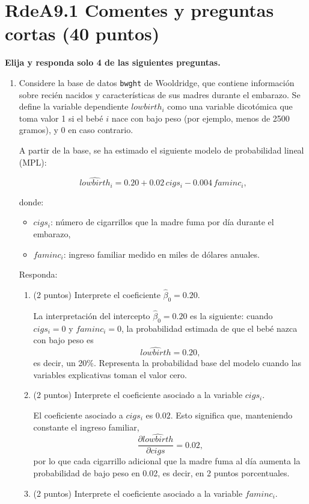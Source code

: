 \documentclass[10pt,a4paper]{article}
\begin{document}
\section{RdeA9.1 Comentes y preguntas cortas (40 puntos)}
{\bf Elija y responda solo 4 de las siguientes preguntas.}
\begin{enumerate}
    \item 
Considere la base de datos \texttt{bwght} de Wooldridge, que contiene información sobre recién nacidos
y características de sus madres durante el embarazo. Se define la variable dependiente
$lowbirth_i$ como una variable dicotómica que toma valor 1 si el bebé $i$ nace con bajo peso
(por ejemplo, menos de 2500 gramos), y 0 en caso contrario.

A partir de la base, se ha estimado el siguiente modelo de probabilidad lineal (MPL):

\[
\widehat{lowbirth}_i
= 0.20 + 0.02\, cigs_i - 0.004\, faminc_i,
\]

donde:
\begin{itemize}
    \item $cigs_i$: número de cigarrillos que la madre fuma por día durante el embarazo,
    \item $faminc_i$: ingreso familiar medido en miles de dólares anuales.
\end{itemize}

Responda:

\begin{enumerate}
    \item (2 puntos) Interprete el coeficiente $\hat\beta_0 = 0.20$.

\color{blue}
La interpretación del intercepto $\hat\beta_0 = 0.20$ es la siguiente:
    cuando $cigs_i = 0$ y $faminc_i = 0$, la probabilidad estimada de que el bebé
    nazca con bajo peso es
    \[
        \widehat{lowbirth} = 0.20,
    \]
    es decir, un 20\%. Representa la probabilidad base del modelo cuando las
    variables explicativas toman el valor cero.
\color{black}

    
    \item (2 puntos) Interprete el coeficiente asociado a la variable $cigs_i$.

    \color{blue}
El coeficiente asociado a $cigs_i$ es $0.02$. Esto significa que,
    manteniendo constante el ingreso familiar,
    \[
        \frac{\partial \widehat{lowbirth}}{\partial cigs} = 0.02,
    \]
    por lo que cada cigarrillo adicional que la madre fuma al día aumenta la
    probabilidad de bajo peso en 0.02, es decir, en 2 puntos porcentuales.
\color{black}
    \item (2 puntos) Interprete el coeficiente asociado a la variable $faminc_i$.


\end{enumerate}
\end{enumerate}
\end{document}
